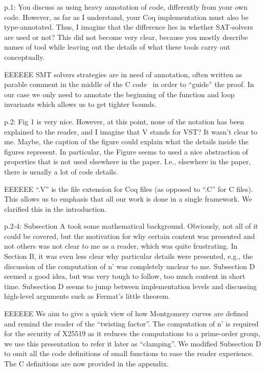 p.1: You discuss \cite{Ber06} as using heavy annotation of code,
differently from your own code. However, as far as I understand,
your Coq implementation must also be type-annotated. Thus,
I imagine that the difference lies in whether SAT-solvers are
used or not? This did not become very clear, because you
mostly describe names of tool while leaving out the details of
what these tools carry out conceptually.

\begin{answer}{EEEEEE}
SMT solvers strategies are in need of annotation, often written
as parable comment in the middle of the C code~\cite{acsl}
in order to ``guide'' the proof. In our case we only need to
annotate the beginning of the function and loop invariants
which allows us to get tighter bounds.
\end{answer}

p.2: Fig 1 is very nice. However, at this point, none of
the notation has been explained to the reader, and I imagine
that V stands for VST? It wasn't clear to me. Maybe, the
caption of the figure could explain what the details inside the
figures represent. In particular, the Figure seems to used a
nice abstraction of properties that is not used elsewhere in
the paper. I.e., elsewhere in the paper, there is usually a lot
of code details.

\begin{answer}{EEEEEE}
``.V'' is the file extension for Coq files (as opposed to ``.C'' for C
files). This allows us to emphasis that all our work is done
in a single framework. We clarified this in the introduction.
\end{answer}

p.2-4: Subsection A took some mathematical background.
Obviously, not all of it could be covered, but the motivation
for why certain content was presented and not others was not
clear to me as a reader, which was quite frustrating. In Section
B, it was even less clear why particular details were presented,
e.g., the discussion of the computation of n’ was completely
unclear to me. Subsection D seemed a good idea, but was very
tough to follow, too much content in short time. Subsection D
seems to jump between implementation levels and discussing
high-level arguments such as Fermat’s little theorem.

\begin{answer}{EEEEEE}
We aim to give a quick view of how Montgomery curves are
defined and remind the reader of the ``twisting factor''. The
computation of n' is required for the security of X25519 as
it reduces the computations to a prime-order group, we use
this presentation to refer it later as ``clamping''. We
modified Subsection D to omit all the code definitions of small
functions to ease the reader experience. The C definitions
are now provided in the appendix.
\end{answer}

